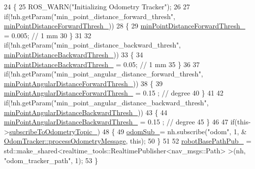 \begin{DoxyCode}
24 \{
25     ROS\_WARN(\textcolor{stringliteral}{"Initializing Odometry Tracker"});
26 
27     \textcolor{keywordflow}{if}(!nh.getParam(\textcolor{stringliteral}{"min\_point\_distance\_forward\_thresh"},
      \hyperlink{classsmacc__odom__tracker_1_1OdomTracker_a0017d7740d99c2cc8ba946495b96ce41}{minPointDistanceForwardThresh\_}))
28     \{
29         \hyperlink{classsmacc__odom__tracker_1_1OdomTracker_a0017d7740d99c2cc8ba946495b96ce41}{minPointDistanceForwardThresh\_} = 0.005; \textcolor{comment}{// 1 mm}
30     \}
31 
32     \textcolor{keywordflow}{if}(!nh.getParam(\textcolor{stringliteral}{"min\_point\_distance\_backward\_thresh"},
      \hyperlink{classsmacc__odom__tracker_1_1OdomTracker_a79d94520c5da1852602aaf264377a82f}{minPointDistanceBackwardThresh\_}))
33     \{
34         \hyperlink{classsmacc__odom__tracker_1_1OdomTracker_a79d94520c5da1852602aaf264377a82f}{minPointDistanceBackwardThresh\_} = 0.05; \textcolor{comment}{// 1 mm}
35     \}
36 
37     \textcolor{keywordflow}{if}(!nh.getParam(\textcolor{stringliteral}{"min\_point\_angular\_distance\_forward\_thresh"},
      \hyperlink{classsmacc__odom__tracker_1_1OdomTracker_a1611f6e11f48e8c2bdf6d16adf35fa2a}{minPointAngularDistanceForwardThresh\_}))
38     \{
39         \hyperlink{classsmacc__odom__tracker_1_1OdomTracker_a1611f6e11f48e8c2bdf6d16adf35fa2a}{minPointAngularDistanceForwardThresh\_} = 0.15 ; \textcolor{comment}{// degree}
40     \}
41 
42     \textcolor{keywordflow}{if}(!nh.getParam(\textcolor{stringliteral}{"min\_point\_angular\_distance\_backward\_thresh"},
      \hyperlink{classsmacc__odom__tracker_1_1OdomTracker_ac7cac171a63c8981f8233f71c94d0776}{minPointAngularDistanceBackwardThresh\_}))
43     \{
44         \hyperlink{classsmacc__odom__tracker_1_1OdomTracker_ac7cac171a63c8981f8233f71c94d0776}{minPointAngularDistanceBackwardThresh\_} = 0.15 ; \textcolor{comment}{// degree}
45     \}
46 
47     \textcolor{keywordflow}{if}(this->\hyperlink{classsmacc__odom__tracker_1_1OdomTracker_a394c4040c01f687c427d34c0ab50ba3e}{subscribeToOdometryTopic\_})
48     \{
49         \hyperlink{classsmacc__odom__tracker_1_1OdomTracker_a901bd60f4c1d21537a160d034ff504ef}{odomSub\_}= nh.subscribe(\textcolor{stringliteral}{"odom"}, 1, &
      \hyperlink{classsmacc__odom__tracker_1_1OdomTracker_adef7b87ba453ca86886239d875344de1}{OdomTracker::processOdometryMessage}, \textcolor{keyword}{this});
50     \}
51 
52     \hyperlink{classsmacc__odom__tracker_1_1OdomTracker_a32d060919f2630e0695ce016c0563a3f}{robotBasePathPub\_} = std::make\_shared<realtime\_tools::RealtimePublisher<nav\_msgs::Path>
      >(nh, \textcolor{stringliteral}{"odom\_tracker\_path"}, 1);
53 \}
\end{DoxyCode}


